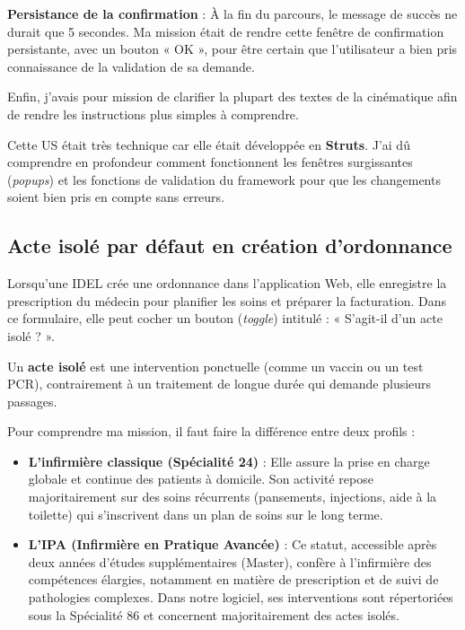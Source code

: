 \documentclass{article}
\begin{document}
\textbf{Persistance de la confirmation} :
À la fin du parcours, le message de succès ne durait que 5 secondes. Ma mission était de rendre cette fenêtre de confirmation persistante, avec un bouton « OK », pour être certain que l'utilisateur a bien pris connaissance de la validation de sa demande.

Enfin, j'avais pour mission de clarifier la plupart des textes de la cinématique afin de rendre les instructions plus simples à comprendre.

Cette US était très technique car elle était développée en \textbf{Struts}. J'ai dû comprendre en profondeur comment fonctionnent les fenêtres surgissantes (\textit{popups}) et les fonctions de validation du framework pour que les changements soient bien pris en compte sans erreurs.

\subsection{Acte isolé par défaut en création d'ordonnance}

Lorsqu'une IDEL crée une ordonnance dans l'application Web, elle enregistre la prescription du médecin pour planifier les soins et préparer la facturation. Dans ce formulaire, elle peut cocher un bouton (\textit{toggle}) intitulé : « S'agit-il d'un acte isolé ? ».

Un \textbf{acte isolé} est une intervention ponctuelle (comme un vaccin ou un test PCR), contrairement à un traitement de longue durée qui demande plusieurs passages.

Pour comprendre ma mission, il faut faire la différence entre deux profils :

\begin{itemize}
    \item \textbf{L'infirmière classique (Spécialité 24)} : Elle assure la prise en charge globale et continue des patients à domicile. Son activité repose majoritairement sur des soins récurrents (pansements, injections, aide à la toilette) qui s'inscrivent dans un plan de soins sur le long terme.

    \newpage
    
    \item \textbf{L'IPA (Infirmière en Pratique Avancée)} : Ce statut, accessible après deux années d'études supplémentaires (Master), confère à l'infirmière des compétences élargies, notamment en matière de prescription et de suivi de pathologies complexes. Dans notre logiciel, ses interventions sont répertoriées sous la Spécialité 86 et concernent majoritairement des actes isolés.
\end{itemize}
\end{document}
